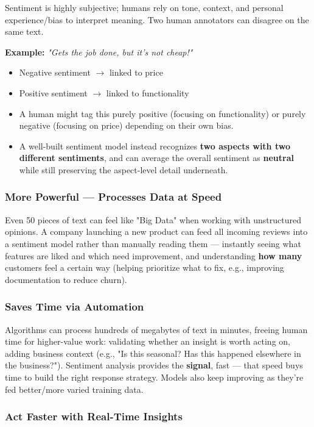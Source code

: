 \documentclass[12pt,openany]{book}
\begin{document}
Sentiment is highly subjective; humans rely on tone, context, and personal experience/bias to interpret meaning. Two human annotators can disagree on the same text.

\textbf{Example:} \textit{"Gets the job done, but it's not cheap!"}
\begin{itemize}[leftmargin=*]
    \item Negative sentiment \(\rightarrow\) linked to price
    \item Positive sentiment \(\rightarrow\) linked to functionality
    \item A human might tag this purely positive (focusing on functionality) or purely negative (focusing on price) depending on their own bias.
    \item A well-built sentiment model instead recognizes \textbf{two aspects with two different sentiments}, and can average the overall sentiment as \textbf{neutral} while still preserving the aspect-level detail underneath.
\end{itemize}

\subsubsection{More Powerful --- Processes Data at Speed}

Even 50 pieces of text can feel like "Big Data" when working with unstructured opinions. A company launching a new product can feed all incoming reviews into a sentiment model rather than manually reading them --- instantly seeing what features are liked and which need improvement, and understanding \textbf{how many} customers feel a certain way (helping prioritize what to fix, e.g., improving documentation to reduce churn).

\subsubsection{Saves Time via Automation}

Algorithms can process hundreds of megabytes of text in minutes, freeing human time for higher-value work: validating whether an insight is worth acting on, adding business context (e.g., "Is this seasonal? Has this happened elsewhere in the business?"). Sentiment analysis provides the \textbf{signal}, fast --- that speed buys time to build the right response strategy. Models also keep improving as they're fed better/more varied training data.

\subsubsection{Act Faster with Real-Time Insights}
\end{document}

